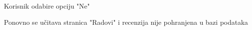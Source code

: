 \begin{packed_item}
\begin{packed_enum}
						\end{packed_enum}

						\item[] \begin{packed_enum}
							\item[6.a] Korisnik odabire opciju "Ne"
							\item[] \begin{packed_enum}
								\item[1.] Ponovno se učitava stranica "Radovi" i recenzija nije pohranjena u bazi podataka
							\end{packed_enum}
							
						\end{packed_enum}
						
					\end{packed_item}
					
